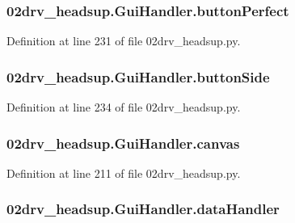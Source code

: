 \subsubsection[{\texorpdfstring{button\+Perfect}{buttonPerfect}}]{\setlength{\rightskip}{0pt plus 5cm}02drv\+\_\+headsup.\+Gui\+Handler.\+button\+Perfect}\hypertarget{class02drv__headsup_1_1_gui_handler_a3fbd010c529d6031ea7b79ac456cc82f}{}\label{class02drv__headsup_1_1_gui_handler_a3fbd010c529d6031ea7b79ac456cc82f}


Definition at line 231 of file 02drv\+\_\+headsup.\+py.

\subsubsection[{\texorpdfstring{button\+Side}{buttonSide}}]{\setlength{\rightskip}{0pt plus 5cm}02drv\+\_\+headsup.\+Gui\+Handler.\+button\+Side}\hypertarget{class02drv__headsup_1_1_gui_handler_a415808846602519a790a038b95b01640}{}\label{class02drv__headsup_1_1_gui_handler_a415808846602519a790a038b95b01640}


Definition at line 234 of file 02drv\+\_\+headsup.\+py.

\subsubsection[{\texorpdfstring{canvas}{canvas}}]{\setlength{\rightskip}{0pt plus 5cm}02drv\+\_\+headsup.\+Gui\+Handler.\+canvas}\hypertarget{class02drv__headsup_1_1_gui_handler_ac6fd30b15298258734a1ad2c565777b1}{}\label{class02drv__headsup_1_1_gui_handler_ac6fd30b15298258734a1ad2c565777b1}


Definition at line 211 of file 02drv\+\_\+headsup.\+py.

\subsubsection[{\texorpdfstring{data\+Handler}{dataHandler}}]{\setlength{\rightskip}{0pt plus 5cm}02drv\+\_\+headsup.\+Gui\+Handler.\+data\+Handler}\hypertarget{class02drv__headsup_1_1_gui_handler_a2775bfc8da60d278fd83e7bd5181765a}{}\label{class02drv__headsup_1_1_gui_handler_a2775bfc8da60d278fd83e7bd5181765a}


